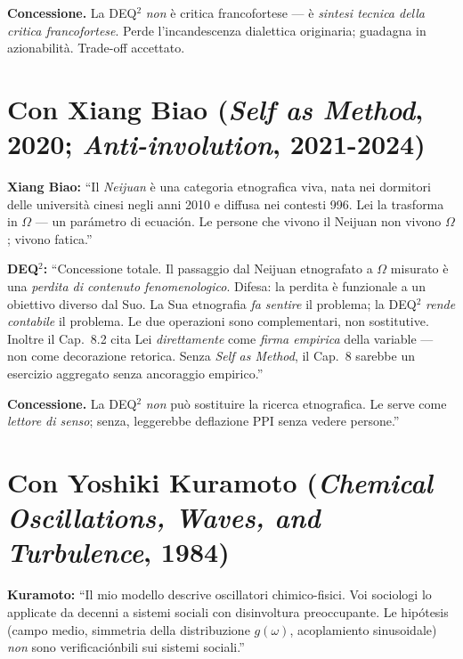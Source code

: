 \textbf{Concessione.} La DEQ$^2$ \emph{non} è critica francofortese --- è
\emph{sintesi tecnica della critica francofortese}. Perde
l'incandescenza dialettica originaria; guadagna in azionabilità.
Trade-off accettato.



\section{\texorpdfstring{Con Xiang Biao (\emph{Self as Method}, 2020;
\emph{Anti-involution},
2021-2024)}{Con Xiang Biao (Self as Method, 2020; Anti-involution, 2021-2024)}}\label{con-xiang-biao-self-as-method-2020-anti-involution-2021-2024}

\textbf{Xiang Biao:} ``Il \emph{Neijuan} è una categoria etnografica
viva, nata nei dormitori delle università cinesi negli anni 2010 e
diffusa nei contesti 996. Lei la trasforma in \(\Omega\) --- un
parámetro di ecuación. Le persone che vivono il Neijuan non vivono
\(\Omega\); vivono fatica.''

\textbf{DEQ$^2$:} ``Concessione totale. Il passaggio dal Neijuan
etnografato a \(\Omega\) misurato è una \emph{perdita di contenuto
fenomenologico}. Difesa: la perdita è funzionale a un obiettivo diverso
dal Suo. La Sua etnografia \emph{fa sentire} il problema; la DEQ$^2$
\emph{rende contabile} il problema. Le due operazioni sono
complementari, non sostitutive. Inoltre il Cap.~8.2 cita Lei
\emph{direttamente} come \emph{firma empirica} della variable --- non
come decorazione retorica. Senza \emph{Self as Method}, il Cap.~8
sarebbe un esercizio aggregato senza ancoraggio empirico.''

\textbf{Concessione.} La DEQ$^2$ \emph{non} può sostituire la ricerca
etnografica. Le serve come \emph{lettore di senso}; senza, leggerebbe
deflazione PPI senza vedere persone.''



\section{\texorpdfstring{Con Yoshiki Kuramoto (\emph{Chemical
Oscillations, Waves, and Turbulence},
1984)}{Con Yoshiki Kuramoto (Chemical Oscillations, Waves, and Turbulence, 1984)}}\label{con-yoshiki-kuramoto-chemical-oscillations-waves-and-turbulence-1984}

\textbf{Kuramoto:} ``Il mio modello descrive oscillatori chimico-fisici.
Voi sociologi lo applicate da decenni a sistemi sociali con disinvoltura
preoccupante. Le hipótesis (campo medio, simmetria della distribuzione
\(g(\omega)\), acoplamiento sinusoidale) \emph{non} sono verificaciónbili
sui sistemi sociali.''

